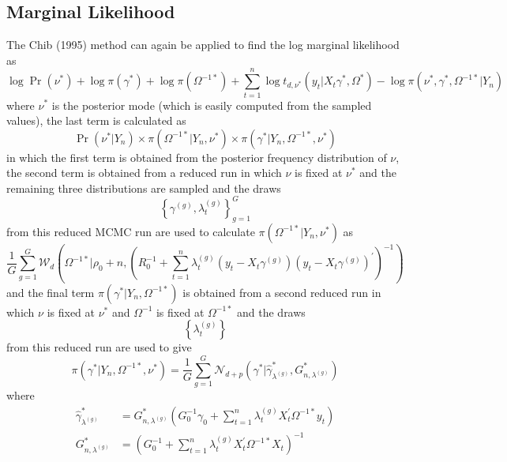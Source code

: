 \documentclass[12pt]{article}
\begin{document}
\subsection{Marginal Likelihood}

The Chib (1995) method can again be applied to find the log marginal
likelihood as
\begin{equation*}
\log \Pr \left( \nu ^{\ast }\right) +\log \pi \left( \gamma ^{\ast }\right)
+\log \pi \left( \Omega ^{-1\ast }\right) +\sum_{t=1}^{n}\log t_{d,\nu
^{\ast }}\left( y_{t}|X_{t}\gamma ^{\ast },\Omega ^{\ast }\right) -\log \pi
\left( \nu ^{\ast },\gamma ^{\ast },\Omega ^{-1\ast }|Y_{n}\right)
\end{equation*}%
where $\nu ^{\ast }$ is the posterior mode (which is easily computed from
the sampled values), the last term is calculated as%
\begin{equation*}
\Pr \left( \nu ^{\ast }|Y_{n}\right) \times \pi \left( \Omega ^{-1\ast
}|Y_{n},\nu ^{\ast }\right) \times \pi \left( \gamma ^{\ast }|Y_{n},\Omega
^{-1\ast },\nu ^{\ast }\right)
\end{equation*}%
in which the first term is obtained from the posterior frequency
distribution of $\nu $, the second term is obtained from a reduced run in
which $\nu $ is fixed at $\nu ^{\ast }$ and the remaining three
distributions are sampled and the draws
\begin{equation*}
\left\{ \gamma ^{(g)},\lambda _{t}^{(g)}\right\} _{g=1}^{G}
\end{equation*}%
from this reduced MCMC run are used to calculate $\pi \left( \Omega ^{-1\ast
}|Y_{n},\nu ^{\ast }\right) $ as
\begin{equation*}
\frac{1}{G}\sum_{g=1}^{G}\mathcal{W}_{d}\left( \Omega ^{-1\ast }|\rho
_{0}+n,\left( R_{0}^{-1}+\sum_{t=1}^{n}\lambda _{t}^{(g)}\left(
y_{t}-X_{t}\gamma ^{(g)}\right) \left( y_{t}-X_{t}\gamma ^{(g)}\right)
^{\prime }\right) ^{-1}\right)
\end{equation*}%
and the final term $\pi \left( \gamma ^{\ast }|Y_{n},\Omega ^{-1\ast
}\right) $ is obtained from a second reduced run in which $\nu $ is fixed at
$\nu ^{\ast }$ and $\Omega ^{-1}$ is fixed at $\Omega ^{-1\ast }$ and the
draws
\begin{equation*}
\left\{ \lambda _{t}^{(g)}\right\}
\end{equation*}%
from this reduced run are used to give
\begin{equation*}
\pi (\gamma ^{\ast }|Y_{n},\Omega ^{-1\ast },\nu ^{\ast })=\frac{1}{G}%
\sum_{g=1}^{G}\mathcal{N}_{d+p}\left( \gamma ^{\ast }|\hat{\gamma}_{\lambda
^{(g)}}^{\ast },G_{n,\lambda ^{(g)}}^{\ast }\right)
\end{equation*}%
where%
\begin{align*}
\hat{\gamma}_{\lambda ^{(g)}}^{\ast }& =G_{n,\lambda ^{(g)}}^{\ast }\left(
G_{0}^{-1}\gamma _{0}+\sum_{t=1}^{n}\lambda _{t}^{(g)}X_{t}^{\prime }\Omega
^{-1\ast }y_{t}\right)  \\
G_{n,\lambda ^{(g)}}^{\ast }& =\left( G_{0}^{-1}+\sum_{t=1}^{n}\lambda
_{t}^{(g)}X_{t}^{\prime }\Omega ^{-1\ast }X_{t}\right) ^{-1}
\end{align*}
\end{document}
